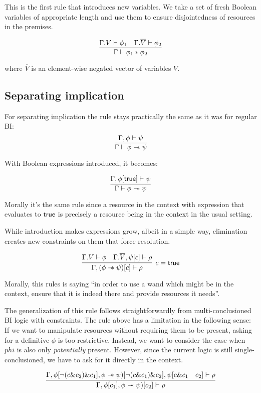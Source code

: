 This is the first rule that introduces new variables.
We take a set of fresh Boolean variables of appropriate length and use them to ensure disjointedness of resources in the premises.

\[\infer{\Gamma \vdash \phi_1 \ast \phi_2}
        {\Gamma. V \vdash \phi_1 &
         \Gamma. \overline{V} \vdash \phi_2}\]

where \(\overline{V}\) is an element-wise negated vector of variables \(V\).

\subsection{Separating implication}
\label{sec:separating-impl-bi-with-constr}


For separating implication the rule stays practically the same as it was for regular BI:
\[
\infer{\Gamma \vdash \phi \wand \psi}
      {\Gamma , \phi \vdash \psi}
\]

With Boolean expressions introduced, it becomes:

\[
\infer{\Gamma \vdash \phi \wand \psi}
      {\Gamma , \phi[\true] \vdash \psi}
\]

Morally it's the same rule since a resource in the context with expression that evaluates to \(\textsf{true}\) is precisely a resource being in the context in the usual setting.

While introduction makes expressions grow, albeit in a simple way, elimination creates new constraints on them that force resolution.

\[
\infer[ c = \true ]
      {\Gamma, (\phi \wand \psi)[c] \vdash \rho}
      {\Gamma. V \vdash \phi &
       \Gamma. \overline{V}, \psi[c] \vdash \rho}
\]

Morally, this rules is saying ``in order to use a wand which might be in the context, ensure that it is indeed there and provide resources it needs''.

The generalization of this rule follows straightforwardly from multi-conclusioned BI logic with constraints.
The rule above has a limitation in the following sense:
If we want to manipulate resources without requiring them to be present, asking for a definitive \(\phi\) is too restrictive.
Instead, we want to consider the case when \(phi\) is also only \emph{potentially} present.
However, since the current logic is still single-conclusioned, we have to ask for it directly in the context.

\[
\infer{\Gamma, \phi[c_1], \phi \wand \psi)[c_2] \vdash \rho}
      {\Gamma, \phi[\neg (c \& c_2) \& c_1], \phi \wand \psi)[\neg (c \& c_1) \& c_2], \psi[c \& c_1 & c_2] \vdash \rho}
\]

